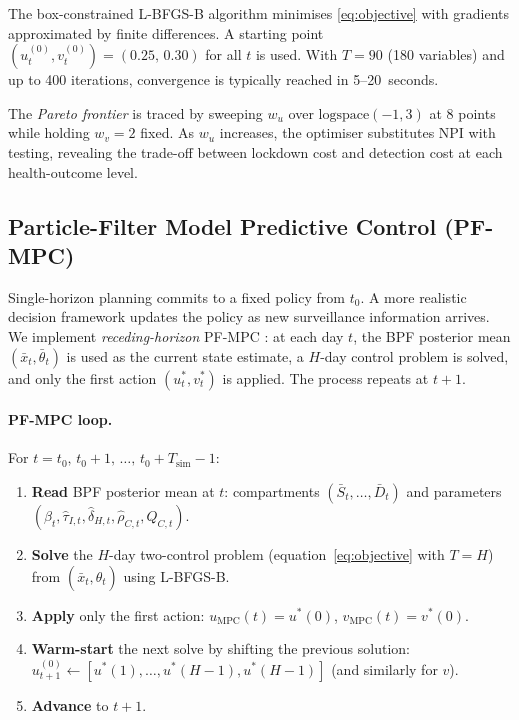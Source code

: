 \documentclass[11pt]{article}
\begin{document}
The box-constrained L-BFGS-B algorithm \cite{zhu1997} minimises
\eqref{eq:objective} with gradients approximated by finite differences.
A starting point $(u_t^{(0)}, v_t^{(0)}) = (0.25,\,0.30)$ for all $t$
is used.  With $T=90$ (180 variables) and up to 400 iterations,
convergence is typically reached in 5--20~seconds.

The \emph{Pareto frontier} is traced by sweeping $w_u$ over
$\mathrm{logspace}(-1,3)$ at 8 points while holding $w_v=2$ fixed.
As $w_u$ increases, the optimiser substitutes NPI with testing,
revealing the trade-off between lockdown cost and detection cost at each
health-outcome level.

\subsection{Particle-Filter Model Predictive Control (PF-MPC)}
\label{sec:pfmpc}

Single-horizon planning commits to a fixed policy from $t_0$.  A more
realistic decision framework updates the policy as new surveillance
information arrives.  We implement \emph{receding-horizon} PF-MPC
\cite{rawlings2009,schwarm1999}: at each day $t$, the BPF posterior mean
$(\bar x_t, \bar\theta_t)$ is used as the current state estimate, a
$H$-day control problem is solved, and only the first action
$(u^*_t, v^*_t)$ is applied.  The process repeats at $t+1$.

\paragraph{PF-MPC loop.}
For $t = t_0,\, t_0+1,\,\ldots,\, t_0+T_{\mathrm{sim}}-1$:
\begin{enumerate}
  \item \textbf{Read} BPF posterior mean at $t$:
        compartments $(\bar S_t,\ldots,\bar D_t)$ and parameters
        $(\hat\beta_t, \hat\tau_{I,t}, \hat\delta_{H,t}, \hat\rho_{C,t},
        \hat Q_{C,t})$.
  \item \textbf{Solve} the $H$-day two-control problem
        (equation~\eqref{eq:objective} with $T=H$)
        from $(\bar x_t, \hat\theta_t)$ using L-BFGS-B.
  \item \textbf{Apply} only the first action:
        $u_{\mathrm{MPC}}(t)=u^*(0)$, $v_{\mathrm{MPC}}(t)=v^*(0)$.
  \item \textbf{Warm-start} the next solve by shifting the previous
        solution: $u^{(0)}_{t+1} \leftarrow [u^*(1),\ldots,u^*(H-1),
        u^*(H-1)]$ (and similarly for $v$).
  \item \textbf{Advance} to $t+1$.
\end{enumerate}
\end{document}
